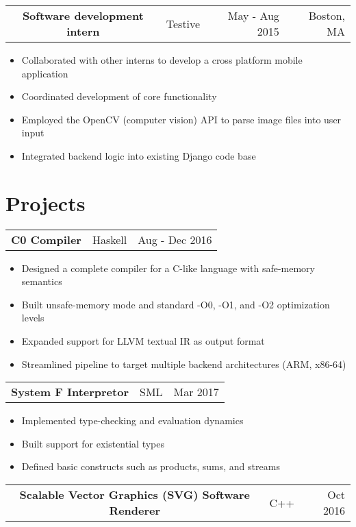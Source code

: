 \documentclass[12pt]{article}
\begin{document}
\begin{tabular}{>{\bfseries}c | c | r | r}
Software development intern & Testive & May - Aug 2015 & Boston, MA
\end{tabular}

\begin{itemize}
\item Collaborated with other interns to develop a cross platform mobile application
\item Coordinated development of core functionality
\item Employed the OpenCV (computer vision) API to parse image files into user input
\item Integrated backend logic into existing Django code base
\end{itemize}


\section{Projects}

\begin{tabular}{>{\bfseries}c | c | r}
C0 Compiler & Haskell & Aug - Dec 2016
\end{tabular}

\begin{itemize}
\item Designed a complete compiler for a C-like language with safe-memory semantics
\item Built unsafe-memory mode and standard -O0, -O1, and -O2 optimization levels
\item Expanded support for LLVM textual IR as output format
\item Streamlined pipeline to target multiple backend architectures (ARM, x86-64)
\end{itemize}

\begin{tabular}{>{\bfseries}c | c | r}
System F Interpretor & SML & Mar 2017
\end{tabular}

\begin{itemize}
\item Implemented type-checking and evaluation dynamics
\item Built support for existential types
\item Defined basic constructs such as products, sums, and streams
\end{itemize}

\begin{tabular}{>{\bfseries}c | c | r}
Scalable Vector Graphics (SVG) Software Renderer & C++ & Oct 2016
\end{tabular}
\end{document}

